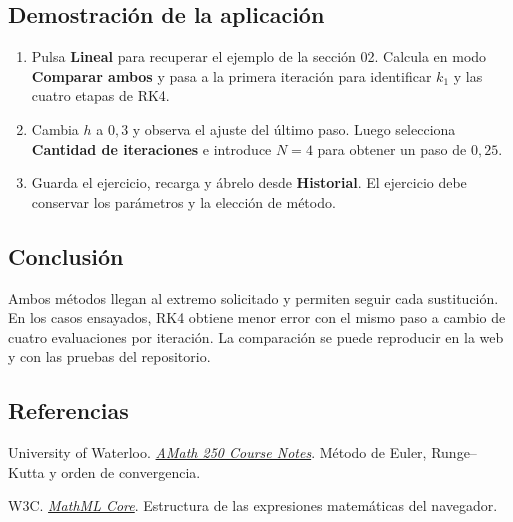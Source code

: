 \documentclass[11pt,a4paper]{article}
\newcommand{\subtopic}[1]{\subsection*{\sffamily\color{Blue}#1}}
\begin{document}
\subtopic{Demostración de la aplicación}
\begin{enumerate}
 \item Pulsa \textbf{Lineal} para recuperar el ejemplo de la sección 02. Calcula en modo \textbf{Comparar ambos} y pasa a la primera iteración para identificar $k_1$ y las cuatro etapas de RK4.
 \item Cambia $h$ a $0{,}3$ y observa el ajuste del último paso. Luego selecciona \textbf{Cantidad de iteraciones} e introduce $N=4$ para obtener un paso de $0{,}25$.
 \item Guarda el ejercicio, recarga y ábrelo desde \textbf{Historial}. El ejercicio debe conservar los parámetros y la elección de método.
\end{enumerate}

\subtopic{Conclusión}
Ambos métodos llegan al extremo solicitado y permiten seguir cada sustitución. En los casos ensayados, RK4 obtiene menor error con el mismo paso a cambio de cuatro evaluaciones por iteración. La comparación se puede reproducir en la web y con las pruebas del repositorio.

\subtopic{Referencias}
University of Waterloo. \href{https://www.math.uwaterloo.ca/~jjwest/course_notes/AMath250_Course_Notes.pdf}{\textit{AMath 250 Course Notes}}. Método de Euler, Runge--Kutta y orden de convergencia.\par
W3C. \href{https://www.w3.org/TR/mathml-core/}{\textit{MathML Core}}. Estructura de las expresiones matemáticas del navegador.
\end{document}
